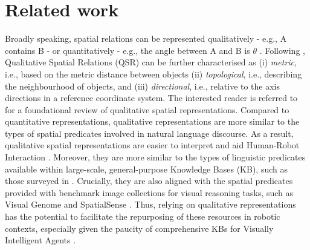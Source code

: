 \documentclass{article}
\begin{document}

\section{Related work}
Broadly speaking, spatial relations can be represented qualitatively - e.g., A contains B - or quantitatively - e.g., the angle between A and B is $\theta$ \cite{thippur_comparison_2015}. Following \cite{borrmann_query_2010}, Qualitative Spatial Relations (QSR) can be further characterised as (i) \textit{metric}, i.e., based on the metric distance between objects (ii) \textit{topological}, i.e., describing the neighbourhood of objects, and (iii) \textit{directional}, i.e., relative to the axis directions in a reference coordinate system. The interested reader is referred to \cite{cohn_chapter_2008} for a foundational review of qualitative spatial representations. Compared to quantitative representations, qualitative representations are more similar to the types of spatial predicates involved in natural language discourse. As a result, qualitative spatial representations are easier to interpret and aid Human-Robot Interaction \cite{sarthou2019semantic,sisbot_where_2019,thippur_non-parametric_2017}. Moreover, they are more similar to the types of linguistic predicates available within large-scale, general-purpose Knowledge Bases (KB), such as those surveyed in \cite{storks2019recent}. Crucially, they are also aligned with the spatial predicates provided with benchmark image collections for visual reasoning tasks, such as Visual Genome \cite{krishna2017visual} and SpatialSense \cite{yang_spatialsense_2019}. Thus, relying on qualitative representations has the potential to facilitate the repurposing of these resources in robotic contexts, especially given the paucity of comprehensive KBs for Visually Intelligent Agents \cite{chiatti_towards_2020}. 
\end{document}
